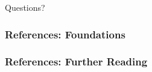 \documentclass[10pt,aspect-ratio=4:3]{ltx-talk}
\begin{document}
\begin{standout}
  Questions?
\end{standout}

\begin{frame}
  \frametitle{References: Foundations}
  \small
  \printbibliography[heading=none,category=foundations]
\end{frame}

\begin{frame}
  \frametitle{References: Further Reading}
  \small
  \printbibliography[heading=none,notcategory=foundations]
\end{frame}
\end{document}
